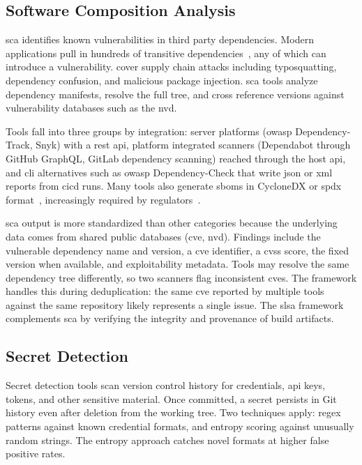 
\subsection{Software Composition Analysis}

\Gls{sca} identifies known vulnerabilities in third party dependencies. Modern applications pull in hundreds of transitive dependencies~\cite{Anderson2020}, any of which can introduce a vulnerability. \textcite{Ohm2020} cover supply chain attacks including typosquatting, dependency confusion, and malicious package injection. \gls{sca} tools analyze dependency manifests, resolve the full tree, and cross reference versions against vulnerability databases such as the \gls{nvd}.

Tools fall into three groups by integration: server platforms (\gls{owasp} Dependency-Track, Snyk) with a \gls{rest} \gls{api}, platform integrated scanners (Dependabot through GitHub GraphQL, GitLab dependency scanning) reached through the host \gls{api}, and \gls{cli} alternatives such as \gls{owasp} Dependency-Check that write \gls{json} or \gls{xml} reports from \gls{cicd} runs. Many tools also generate \glspl{sbom} in CycloneDX or \gls{spdx} format~\cite{CycloneDX2024, SPDX2024}, increasingly required by regulators~\cite{NTIA2021}.

\gls{sca} output is more standardized than other categories because the underlying data comes from shared public databases (\gls{cve}, \gls{nvd}). Findings include the vulnerable dependency name and version, a \gls{cve} identifier, a \gls{cvss} score, the fixed version when available, and exploitability metadata. Tools may resolve the same dependency tree differently, so two scanners flag inconsistent \glspl{cve}. The framework handles this during deduplication: the same \gls{cve} reported by multiple tools against the same repository likely represents a single issue. The \gls{slsa} framework~\cite{SLSA2024} complements \gls{sca} by verifying the integrity and provenance of build artifacts.


\subsection{Secret Detection}

Secret detection tools scan version control history for credentials, \gls{api} keys, tokens, and other sensitive material. Once committed, a secret persists in Git history even after deletion from the working tree. Two techniques apply: regex patterns against known credential formats, and entropy scoring against unusually random strings. The entropy approach catches novel formats at higher false positive rates.

